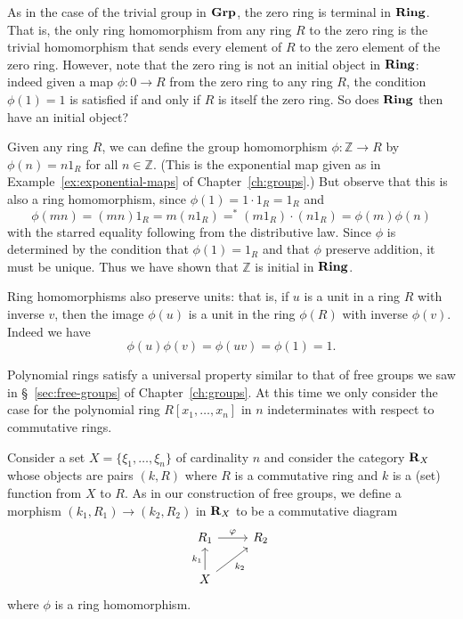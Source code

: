 As in the case of the trivial group in \(\mathbf{Grp}\), the zero ring is terminal in
\(\mathbf{Ring}\). That is, the only ring homomorphism from any ring \(R\) to the zero
ring is the trivial homomorphism that sends every element of \(R\) to the zero
element of the zero ring. However, note that the zero ring is not an initial
object in \(\mathbf{Ring}\): indeed given a map \(\phi: 0 \to R\) from the zero ring to
any ring \(R\), the condition \(\phi(1) = 1\) is satisfied if and only if \(R\)
is itself the zero ring. So does \(\mathbf{Ring}\) then have an initial object?

Given any ring \(R\), we can define the group homomorphism \(\phi: \mathbb{Z}
\to R\) by \(\phi(n) = n1_R\) for all \(n \in \mathbb{Z}\). (This is the
exponential map given as in Example~\ref{ex:exponential-maps} of
Chapter~\ref{ch:groups}.) But observe that this is also a ring homomorphism,
since \(\phi(1) = 1 \cdot 1_R = 1_R\) and
\[
    \phi(mn) = (mn)1_R = m(n1_R) =^* (m1_R)\cdot(n1_R) = \phi(m)\phi(n)
\]
with the starred equality following from the distributive law. Since \(\phi\) is
determined by the condition that \(\phi(1) = 1_R\) and that \(\phi\) preserve
addition, it must be unique. Thus we have shown that \(\mathbb{Z}\) is initial
in \(\mathbf{Ring}\).

Ring homomorphisms also preserve units: that is, if \(u\) is a unit in a ring
\(R\) with inverse \(v\), then the image \(\phi(u)\) is a unit in the ring
\(\phi(R)\) with inverse \(\phi(v)\). Indeed we have
\[
    \phi(u)\phi(v) = \phi(uv) = \phi(1) = 1.
\]

\medskip

Polynomial rings satisfy a universal property similar to that of free groups we
saw in \S~\ref{sec:free-groups} of Chapter~\ref{ch:groups}. At this time we only
consider the case for the polynomial ring \(R[x_1, \ldots, x_n]\) in \(n\)
indeterminates with respect to commutative rings.

Consider a set \(X = \{\xi_1, \ldots, \xi_n\}\) of cardinality \(n\) and
consider the category \(\mathbf{R}_X\) whose objects are pairs \((k, R)\) where
\(R\) is a commutative ring and \(k\) is a (set) function from \(X\) to \(R\).
As in our construction of free groups, we define a morphism \((k_1, R_1) \to
(k_2, R_2)\) in \(\mathbf{R}_X\) to be a commutative diagram
\[
    \begin{tikzcd}
        R_1 \ar[r, "\phi"] & R_2\\
         X \ar[u, "k_1"] \ar[ur, "k_2"'] &
    \end{tikzcd}
\]
where \(\phi\) is a ring homomorphism.

